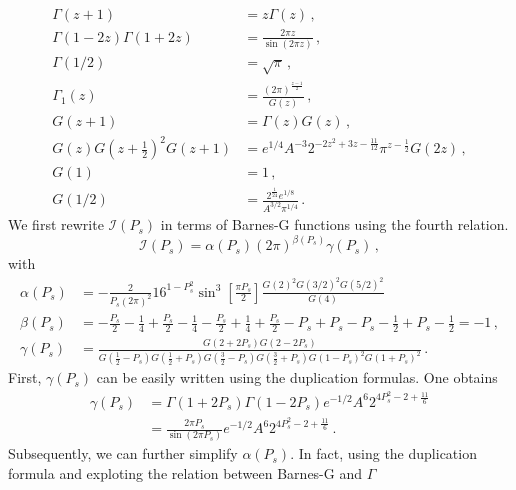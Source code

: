 \documentclass[11pt]{article}
\begin{document}
\begin{equation}\label{eq:identities}
\begin{aligned}
    \Gamma(z+1)&=z\Gamma(z)\,,\\
    \Gamma(1-2z)\Gamma(1+2z)&=\frac{2\pi z}{\sin(2\pi z)}\,,\\
    \Gamma(1/2)&=\sqrt{\pi}\,,\\
    \Gamma_1(z)&=\frac{\left(2\pi\right)^{\frac{z-1}{2}}}{G(z)}\,,\\
    G(z+1)&=\Gamma(z)G(z)\,,\\
    G(z)G(z+\frac{1}{2})^2 G(z+1) &= e^{1/4}A^{-3}2^{-2z^2+3z-\frac{11}{12}}\pi^{z-\frac{1}{2}}G(2z)\,,\\
    G(1)&=1\,,\\
    G(1/2)&=\frac{2^{\frac{1}{24}}e^{1/8}}{A^{3/2}\pi^{1/4}}\,.
\end{aligned}
\end{equation}
We first rewrite $\mathcal{I}(P_s)$ in terms of Barnes-G functions using the fourth relation.
\begin{equation}
    \mathcal{I}(P_s) = \alpha(P_s)\left(2\pi\right)^{\beta(P_s)}\gamma(P_s)\,,
\end{equation}
with
\begin{equation}
    \begin{aligned}
        \alpha(P_s)&= -\frac{2}{P_s\left(2\pi\right)^2}16^{1-P_s^2}\sin^3\left[\frac{\pi P_s}{2}\right]\frac{G(2)^2 G(3/2)^2 G(5/2)^2}{G(4)}\,\\
        \beta(P_s)&=-\frac{P_s}{2}-\frac{1}{4}+\frac{P_s}{2}-\frac{1}{4}-\frac{P_s}{2}+\frac{1}{4}+\frac{P_s}{2}-P_s+P_s-P_s-\frac{1}{2}+P_s-\frac{1}{2}= -1\,,\\
        \gamma(P_s)&= \frac{G(2+2P_s)G(2-2P_s)}{G\left(\frac{1}{2}-P_s\right)G\left(\frac{1}{2}+P_s\right)G\left(\frac{3}{2}-P_s\right)G\left(\frac{3}{2}+P_s\right)G\left(1-P_s\right)^2 G\left(1+P_s\right)^2}\,. 
    \end{aligned}
\end{equation}
First, $\gamma(P_s)$ can be easily written using the duplication formulas. One obtains
\begin{equation}
    \begin{aligned}
        \gamma(P_s)&=\Gamma(1+2P_s)\Gamma(1-2P_s) e^{-1/2}A^{6}2^{4P_s^2-2+\frac{11}{6}}\\
        &= \frac{2\pi P_s}{\sin(2\pi P_s)} e^{-1/2}A^{6}2^{4P_s^2-2+\frac{11}{6}}\,.
    \end{aligned}
\end{equation}
Subsequently, we can further simplify $\alpha(P_s)$. In fact, using the duplication formula and exploting the relation between Barnes-G and $\Gamma$
\end{document}
